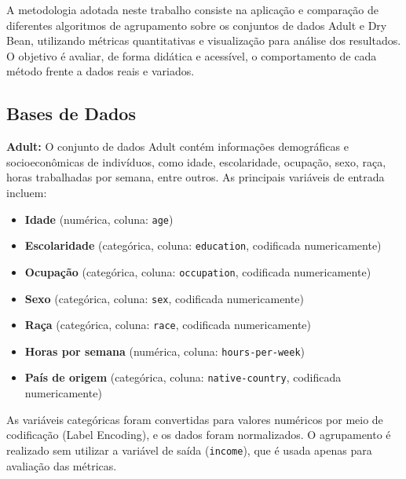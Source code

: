 A metodologia adotada neste trabalho consiste na aplicação e comparação de diferentes algoritmos de agrupamento sobre os conjuntos de dados Adult e Dry Bean, utilizando métricas quantitativas e visualização para análise dos resultados. O objetivo é avaliar, de forma didática e acessível, o comportamento de cada método frente a dados reais e variados.

\subsection{Bases de Dados}

\textbf{Adult:} O conjunto de dados Adult contém informações demográficas e socioeconômicas de indivíduos, como idade, escolaridade, ocupação, sexo, raça, horas trabalhadas por semana, entre outros. As principais variáveis de entrada incluem:
\begin{itemize}
    \item \textbf{Idade} (numérica, coluna: \texttt{age})
    \item \textbf{Escolaridade} (categórica, coluna: \texttt{education}, codificada numericamente)
    \item \textbf{Ocupação} (categórica, coluna: \texttt{occupation}, codificada numericamente)
    \item \textbf{Sexo} (categórica, coluna: \texttt{sex}, codificada numericamente)
    \item \textbf{Raça} (categórica, coluna: \texttt{race}, codificada numericamente)
    \item \textbf{Horas por semana} (numérica, coluna: \texttt{hours-per-week})
    \item \textbf{País de origem} (categórica, coluna: \texttt{native-country}, codificada numericamente)
\end{itemize}
As variáveis categóricas foram convertidas para valores numéricos por meio de codificação (Label Encoding), e os dados foram normalizados. O agrupamento é realizado sem utilizar a variável de saída (\texttt{income}), que é usada apenas para avaliação das métricas.

